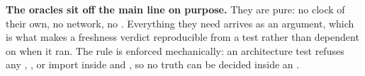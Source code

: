 \begin{note}
\textbf{The oracles sit off the main line on purpose.} They are pure: no clock of their own, no
network, no . Everything they need arrives as an argument, which is what makes a
freshness verdict reproducible from a test rather than dependent on when it ran. The rule is enforced
mechanically: an architecture test refuses any , ,  or
 import inside  and , so no truth can be decided
inside an .
\end{note}
